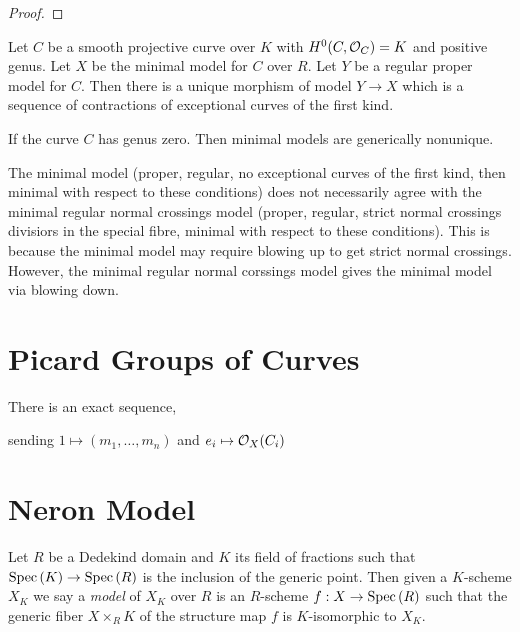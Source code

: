 \documentclass[12pt]{article}
\begin{document}
\begin{proof}

\end{proof}

\begin{lemma}
Let $C$ be a smooth projective curve over $K$ with $H^0(C, \mathcal{O}_{C}) = K$ and positive genus. Let $X$ be the minimal model for $C$ over $R$. Let $Y$ be a regular proper model for $C$. Then there is a unique morphism of model $Y \to X$ which is a sequence of contractions of exceptional curves of the first kind. 
\end{lemma}

\begin{remark}
If the curve $C$ has genus zero. Then minimal models are generically nonunique. 
\end{remark}

\begin{remark}
The minimal model (proper, regular, no exceptional curves of the first kind, then minimal with respect to these conditions) does not necessarily agree with the minimal regular normal crossings model (proper, regular, strict normal  crossings divisiors in the special fibre, minimal with respect to these conditions). This is because the minimal model may require blowing up to get strict normal crossings. However, the minimal regular normal corssings model gives the minimal model via blowing down. 
\end{remark}

\section{Picard Groups of Curves}

\begin{lemma}[0C63]
There is an exact sequence,
\begin{center}
\end{center}
sending $1 \mapsto (m_1, \dots, m_n)$ and $e_i \mapsto \mathcal{O}_{X}(C_i)$ 
\end{lemma}

\section{Neron Model}

\begin{definition}
Let $R$ be a Dedekind domain and $K$ its field of fractions such that $\mathrm{Spec}\left( K \right) \to \mathrm{Spec}\left( R \right)$ is the inclusion of the generic point. Then given a $K$-scheme $X_K$ we say a \textit{model} of $X_K$ over $R$ is an $R$-scheme $f : X \to \mathrm{Spec}\left( R \right)$ such that the generic fiber $X \times_R K$ of the structure map $f$ is $K$-isomorphic to $X_K$. 
\end{definition}
\end{document}
